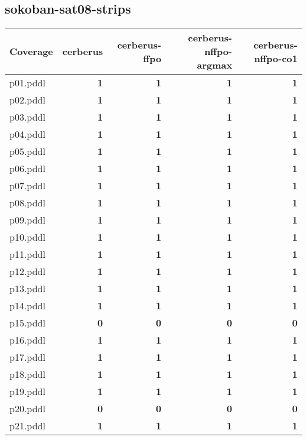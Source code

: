 \documentclass{article}
\begin{document}
\hypertarget{coverage-sokoban-sat08-strips}{}
\subsection*{sokoban-sat08-strips}

\begin{tabular}{@{}lrrrr@{}}
Coverage & cerberus & cerberus-ffpo & cerberus-nffpo-argmax & cerberus-nffpo-co1 \\
\midrule
p01.pddl & \textbf{1} & \textbf{1} & \textbf{1} & \textbf{1} \\
p02.pddl & \textbf{1} & \textbf{1} & \textbf{1} & \textbf{1} \\
p03.pddl & \textbf{1} & \textbf{1} & \textbf{1} & \textbf{1} \\
p04.pddl & \textbf{1} & \textbf{1} & \textbf{1} & \textbf{1} \\
p05.pddl & \textbf{1} & \textbf{1} & \textbf{1} & \textbf{1} \\
p06.pddl & \textbf{1} & \textbf{1} & \textbf{1} & \textbf{1} \\
p07.pddl & \textbf{1} & \textbf{1} & \textbf{1} & \textbf{1} \\
p08.pddl & \textbf{1} & \textbf{1} & \textbf{1} & \textbf{1} \\
p09.pddl & \textbf{1} & \textbf{1} & \textbf{1} & \textbf{1} \\
p10.pddl & \textbf{1} & \textbf{1} & \textbf{1} & \textbf{1} \\
p11.pddl & \textbf{1} & \textbf{1} & \textbf{1} & \textbf{1} \\
p12.pddl & \textbf{1} & \textbf{1} & \textbf{1} & \textbf{1} \\
p13.pddl & \textbf{1} & \textbf{1} & \textbf{1} & \textbf{1} \\
p14.pddl & \textbf{1} & \textbf{1} & \textbf{1} & \textbf{1} \\
p15.pddl & \textbf{0} & \textbf{0} & \textbf{0} & \textbf{0} \\
p16.pddl & \textbf{1} & \textbf{1} & \textbf{1} & \textbf{1} \\
p17.pddl & \textbf{1} & \textbf{1} & \textbf{1} & \textbf{1} \\
p18.pddl & \textbf{1} & \textbf{1} & \textbf{1} & \textbf{1} \\
p19.pddl & \textbf{1} & \textbf{1} & \textbf{1} & \textbf{1} \\
p20.pddl & \textbf{0} & \textbf{0} & \textbf{0} & \textbf{0} \\
p21.pddl & \textbf{1} & \textbf{1} & \textbf{1} & \textbf{1} \\

\end{tabular}
\end{document}
